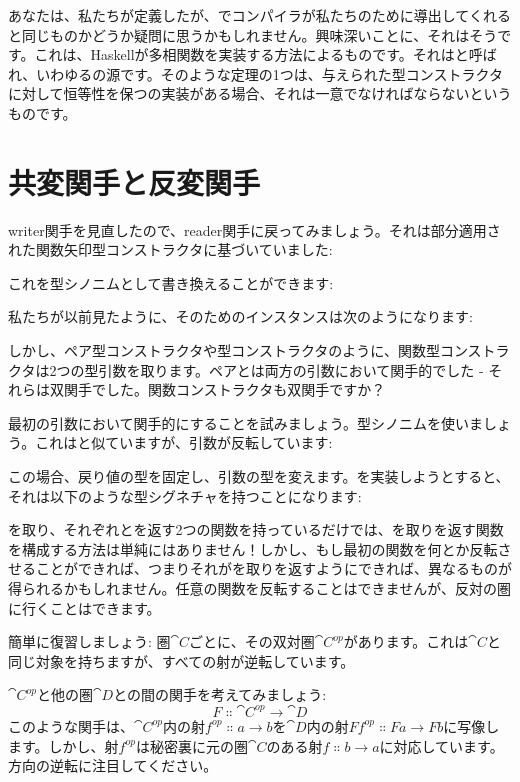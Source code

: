 あなたは、私たちが定義したが、でコンパイラが私たちのために導出してくれると同じものかどうか疑問に思うかもしれません。興味深いことに、それはそうです。これは、Haskellが多相関数を実装する方法によるものです。それはと呼ばれ、いわゆるの源です。そのような定理の1つは、与えられた型コンストラクタに対して恒等性を保つの実装がある場合、それは一意でなければならないというものです。

\section{共変関手と反変関手}

writer関手を見直したので、reader関手に戻ってみましょう。それは部分適用された関数矢印型コンストラクタに基づいていました: 

これを型シノニムとして書き換えることができます: 

私たちが以前見たように、そのためのインスタンスは次のようになります: 

しかし、ペア型コンストラクタや型コンストラクタのように、関数型コンストラクタは2つの型引数を取ります。ペアとは両方の引数において関手的でした - それらは双関手でした。関数コンストラクタも双関手ですか？

最初の引数において関手的にすることを試みましょう。型シノニムを使いましょう。これはと似ていますが、引数が反転しています: 

この場合、戻り値の型を固定し、引数の型を変えます。を実装しようとすると、それは以下のような型シグネチャを持つことになります: 

を取り、それぞれとを返す2つの関数を持っているだけでは、を取りを返す関数を構成する方法は単純にはありません！しかし、もし最初の関数を何とか反転させることができれば、つまりそれがを取りを返すようにできれば、異なるものが得られるかもしれません。任意の関数を反転することはできませんが、反対の圏に行くことはできます。

簡単に復習しましょう: 圏$\cat{C}$ごとに、その双対圏$\cat{C}^\mathit{op}$があります。これは$\cat{C}$と同じ対象を持ちますが、すべての射が逆転しています。

$\cat{C}^\mathit{op}$と他の圏$\cat{D}$との間の関手を考えてみましょう: 
\[F \Colon \cat{C}^\mathit{op} \to \cat{D}\]
このような関手は、$\cat{C}^\mathit{op}$内の射$f^\mathit{op} \Colon a \to b$を$\cat{D}$内の射$F f^\mathit{op} \Colon F a \to F b$に写像します。しかし、射$f^\mathit{op}$は秘密裏に元の圏$\cat{C}$のある射$f \Colon b \to a$に対応しています。方向の逆転に注目してください。

